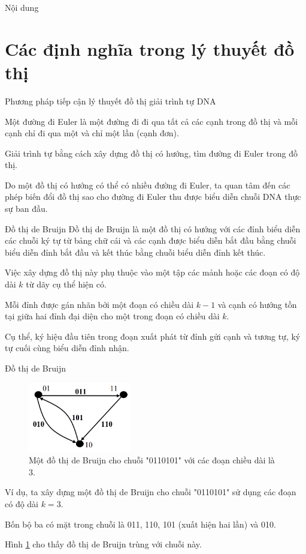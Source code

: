 \documentclass[10pt]{beamer}
\theoremstyle{remark}
\numberwithin{algocf}{section}
\numberwithin{equation}{section}
\numberwithin{dl}{section}
\numberwithin{figure}{section}
\begin{document}
\begin{frame}[plain]{Nội dung}
    \tableofcontents[hidesubsections]
\end{frame}

\section{Các định nghĩa trong lý thuyết đồ thị}

\begin{frame}{Phương pháp tiếp cận lý thuyết đồ thị giải trình tự DNA}

    Một đường đi Euler là một đường đi đi qua tất cả các cạnh trong đồ thị và mỗi cạnh chỉ đi qua một và chỉ một lần (cạnh đơn).

    Giải trình tự bằng cách xây dựng đồ thị có hướng, tìm đường đi Euler trong đồ thị.

    Do một đồ thị có hướng có thể có nhiều đường đi Euler, ta quan tâm đến các phép biến đổi đồ thị sao cho đường đi Euler thu được biểu diễn chuỗi DNA thực sự ban đầu.

    
\end{frame}

\begin{frame}{Đồ thị de Bruijn}
    Đồ thị de Bruijn là một đồ thị có hướng với các đỉnh biểu diễn các chuỗi ký tự từ bảng chữ cái và các cạnh được biểu diễn bắt đầu bằng chuỗi biểu diễn đỉnh bắt đầu và kết thúc bằng chuỗi biểu diễn đỉnh kết thúc.

    Việc xây dựng đồ thị này phụ thuộc vào một tập các mảnh hoặc các đoạn có độ dài $k$ từ dãy cụ thể hiện có.

    Mỗi đỉnh được gán nhãn bởi một đoạn có chiều dài $k-1$ và cạnh có hướng tồn tại giữa hai đỉnh đại diện cho một trong đoạn có chiều dài $k$.

    Cụ thể, ký hiệu đầu tiên trong đoạn xuất phát từ đỉnh gửi cạnh và tương tự, ký tự cuối cùng biểu diễn đỉnh nhận.

\end{frame}

\begin{frame}{Đồ thị de Bruijn}
    \begin{figure}[h!]
        \centering
        \includegraphics[width=0.4\textwidth]{1.png}
        \caption{Một đồ thị de Bruijn cho chuỗi "0110101" với các đoạn chiều dài là 3.}
        \label{fig:1}
    \end{figure}

    Ví dụ, ta xây dựng một đồ thị de Bruijn cho chuỗi "0110101" sử dụng các đoạn có độ dài $k=3$.

    Bốn bộ ba có mặt trong chuỗi là 011, 110, 101 (xuất hiện hai lần) và 010.
    
    Hình \ref{fig:1} cho thấy đồ thị de Bruijn trùng với chuỗi này.
\end{frame}
\end{document}
